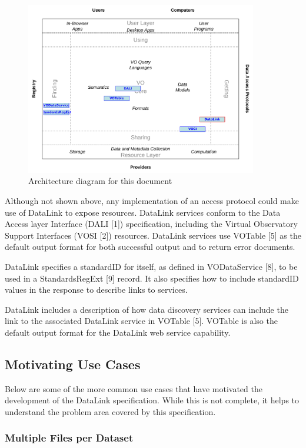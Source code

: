 \documentclass[11pt,a4paper]{ivoa}
\begin{document}
\begin{figure}
\centering
\includegraphics[width=0.9\textwidth]{role_diagram.pdf}
\caption{Architecture diagram for this document}
\label{fig:archdiag}
\end{figure}

Although not shown above, any implementation of an access protocol could
make use of DataLink to expose resources. DataLink services conform to
the Data Access layer Interface (DALI [1]) specification, including the
Virtual Observatory Support Interfaces (VOSI [2]) resources. DataLink
services use VOTable [5] as the default output format for both successful
output and to return error documents.

DataLink specifies a standardID for itself, as defined in VODataService
[8], to be used in a StandardsRegExt [9] record. It also specifies how to
include standardID values in the response to describe links to services.

DataLink includes a description of how data discovery services can include
the link to the associated DataLink service in VOTable [5]. VOTable is
also the default output format for the DataLink web service capability.


\subsection{Motivating Use Cases}

Below are some of the more common use cases that have motivated the
development of the DataLink specification. While this is not complete,
it helps to understand the problem area covered by this specification.


\subsubsection{Multiple Files per Dataset}
\end{document}
